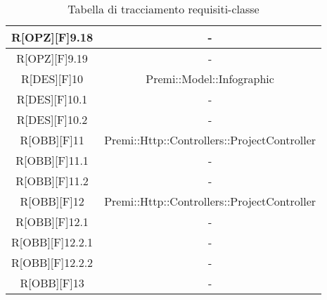 \begin{table}[h]
	\begin{center}
		\begin{tabular}{|c|c|}
			\toprule
			R[OPZ][F]9.18 & -\\
		\midrule
			R[OPZ][F]9.19 & -\\
		\midrule
			R[DES][F]10 & Premi::Model::Infographic\\
		\midrule
			R[DES][F]10.1 & -\\
		\midrule
			R[DES][F]10.2 & -\\
		\midrule
			R[OBB][F]11 & Premi::Http::Controllers::ProjectController\\
		\midrule
			R[OBB][F]11.1 & -\\
		\midrule
			R[OBB][F]11.2 & -\\
		\midrule
			R[OBB][F]12 & Premi::Http::Controllers::ProjectController\\
		\midrule
			R[OBB][F]12.1 & -\\
		\midrule
			R[OBB][F]12.2.1 & -\\
		\midrule
			R[OBB][F]12.2.2 & -\\
		\midrule
			R[OBB][F]13 & -\\
			\bottomrule
		\end{tabular}
	\end{center}
	\caption{Tabella di tracciamento requisiti-classe}
\end{table}